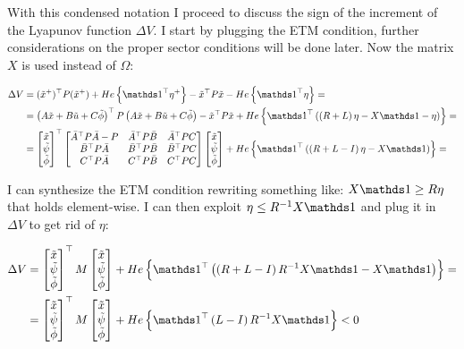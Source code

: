 \documentclass{article}
\begin{document}
With this condensed notation I proceed to discuss the sign of the increment of the Lyapunov function $\Delta V$. I start by plugging the ETM condition, further considerations on the proper sector conditions will be done later. Now the matrix $X$ is used instead of $\Omega$:

\begin{align*}
  \Delta V &= (\tilde{x}^{+})\tr P (\tilde{x}^{+}) + He\left\{ \one\tr \eta^{+} \right\} - \tilde{x}\tr P \tilde{x} - He\left\{ \one\tr \eta \right\} =\\
  &= \left( A \tilde{x} + B \tilde{u} + C \tilde{\phi} \right)\tr P \left( A \tilde{x} + B \tilde{u} + C \tilde{\phi} \right) - \tilde{x}\tr P \tilde{x} + He\left\{ \one\tr \left(   \left( R + L \right)\eta - X \one - \eta  \right) \right\} = \\
  &= \bmx{
    \tilde{x}\\
    \tilde{\psi}\\
    \tilde{\phi}
  }\tr \bmx{
    \bar{A}\tr P \bar{A} - P & \bar{A}\tr P \bar{B} & \bar{A}\tr P C \\
    \bar{B}\tr P \bar{A} & \bar{B}\tr P \bar{B} & \bar{B}\tr P C \\
    C\tr P \bar{A} & C\tr P \bar{B} & C\tr P C
  } \bmx{
    \tilde{x}\\
    \tilde{\psi}\\
    \tilde{\phi}
  } + He\left\{ \one\tr \left( \left( R + L - I \right) \eta - X \one \right) \right\} =
\end{align*}

I can synthesize the ETM condition rewriting something like: $X \one \geq R \eta$ that holds element-wise. I can then exploit $\eta \leq R^{-1} X \one$ and plug it in $\Delta V$ to get rid of $\eta$:

\begin{align*}
  \Delta V &= \bmx{
    \tilde{x}\\
    \tilde{\psi}\\
    \tilde{\phi}
  }\tr M \bmx{
    \tilde{x}\\
    \tilde{\psi}\\
    \tilde{\phi}
  } + He\left\{ \one\tr \left( \left( R + L - I \right) R^{-1} X \one - X \one \right) \right\} = \\
  &= \bmx{
    \tilde{x}\\
    \tilde{\psi}\\
    \tilde{\phi}
  }\tr M \bmx{
    \tilde{x}\\
    \tilde{\psi}\\
    \tilde{\phi}
  } + He\left\{ \one\tr \left( L - I \right) R^{-1} X \one \right\} < 0
\end{align*}
\end{document}
